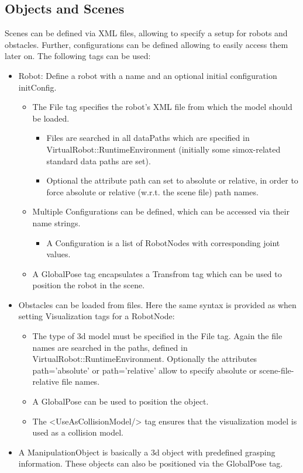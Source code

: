 \documentclass{book}
\begin{document}
\subsection{Objects and Scenes}
\par
Scenes can be defined via XML files, allowing to specify a setup for robots and obstacles. Further, configurations can be defined allowing to easily access them later on. The following tags can be used: 
\begin{itemize}
  \item Robot: Define a robot with a name and an optional initial configuration initConfig. 

  \begin{itemize}
    \item The File tag specifies the robot's XML file from which the model should be loaded. 
    \begin{itemize}
    \item Files are searched in all dataPaths which are specified in VirtualRobot::RuntimeEnvironment (initially some simox-related standard data paths are set). 
    \item Optional the attribute path can set to absolute or relative, in order to force absolute or relative (w.r.t. the scene file) path names. 
    \end{itemize}
    \item Multiple Configurations can be defined, which can be accessed via their name strings. 
    \begin{itemize}
    \item A Configuration is a list of RobotNodes with corresponding joint values. 
    \end{itemize}
    \item A GlobalPose tag encapsulates a Transfrom tag which can be used to position the robot in the scene. 
  \end{itemize}

  \item Obstacles can be loaded from files. Here the same syntax is provided as when setting Visualization tags for a RobotNode: 
  \begin{itemize}
       \item The type of 3d model must be specified in the File tag. Again the file names are searched in the paths, defined in VirtualRobot::RuntimeEnvironment. Optionally the attributes path='absolute' or path='relative' allow to specify absolute or scene-file-relative file names.
      \item A GlobalPose can be used to position the object.
      \item The <UseAsCollisionModel/> tag ensures that the visualization model is used as a collision model.
  \end{itemize}
\item A ManipulationObject is basically a 3d object with predefined grasping information. These objects can also be positioned via the GlobalPose tag. 
\end{itemize}
\end{document}
